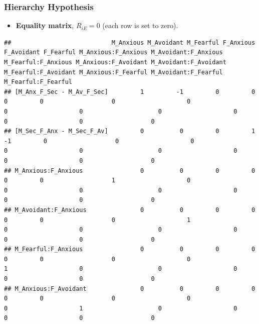 \documentclass[
]{book}
\providecommand{\tightlist}{%
  \setlength{\itemsep}{0pt}\setlength{\parskip}{0pt}}
\begin{document}
\hypertarget{hierarchy-hypothesis}{%
\subsubsection*{Hierarchy Hypothesis}\label{hierarchy-hypothesis}}

\begin{itemize}
\tightlist
\item
  \textbf{Equality matrix}, \(R_{iE} = 0\) (each row is set to zero).
\end{itemize}

\begin{verbatim}
##                            M_Anxious M_Avoidant M_Fearful F_Anxious F_Avoidant F_Fearful M_Anxious:F_Anxious M_Avoidant:F_Anxious M_Fearful:F_Anxious M_Anxious:F_Avoidant M_Avoidant:F_Avoidant M_Fearful:F_Avoidant M_Anxious:F_Fearful M_Avoidant:F_Fearful M_Fearful:F_Fearful
## [M_Anx_F_Sec - M_Av_F_Sec]         1         -1         0         0          0         0                   0                    0                   0                    0                     0                    0                   0                    0                   0
## [M_Sec_F_Anx - M_Sec_F_Av]         0          0         0         1         -1         0                   0                    0                   0                    0                     0                    0                   0                    0                   0
## M_Anxious:F_Anxious                0          0         0         0          0         0                   1                    0                   0                    0                     0                    0                   0                    0                   0
## M_Avoidant:F_Anxious               0          0         0         0          0         0                   0                    1                   0                    0                     0                    0                   0                    0                   0
## M_Fearful:F_Anxious                0          0         0         0          0         0                   0                    0                   1                    0                     0                    0                   0                    0                   0
## M_Anxious:F_Avoidant               0          0         0         0          0         0                   0                    0                   0                    1                     0                    0                   0                    0                   0

\end{verbatim}
\end{document}
